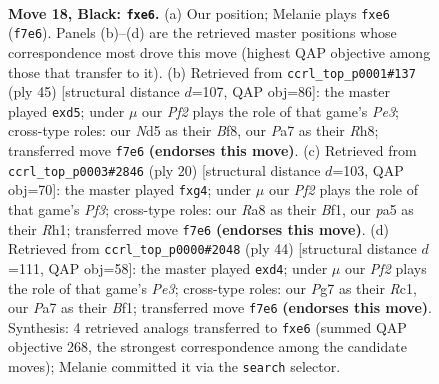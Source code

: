 \documentclass[11pt]{article}
\begin{document}
\clearpage

\begin{figure}[p]\centering
\begin{subfigure}{0.46\textwidth}\centering
\resizebox{\linewidth}{!}{%
\newchessgame
\chessboard[
  setfen={rn2r1k1/ppq2ppp/4N3/P1bn4/7P/1N4P1/1P3PB1/R1BQ1RK1 b - - 0 18},
  showmover=false,
  pgfstyle=straightmove, color=movearrow, markmove={f7-e6}
]}
\caption{}
\end{subfigure}\hfill
\begin{subfigure}{0.46\textwidth}\centering
\resizebox{\linewidth}{!}{%
\newchessgame
\chessboard[
  setfen={4kb1r/n1q2p2/1r2p3/3NP2p/bp1N4/3BQ3/P1P3PP/1K1RR3 b k - 0 23},
  showmover=false,
  pgfstyle=straightmove, color=movearrow, markmove={e6-d5}
]}
\caption{}
\end{subfigure}
\\[4pt]
\begin{subfigure}{0.46\textwidth}\centering
\resizebox{\linewidth}{!}{%
\newchessgame
\chessboard[
  setfen={r1bq1rk1/ppp2pbp/2n3p1/8/2QNP1n1/2N1BP2/PP4PP/R3KB1R w KQ - 1 11},
  showmover=false,
  pgfstyle=straightmove, color=movearrow, markmove={f3-g4}
]}
\caption{}
\end{subfigure}\hfill
\begin{subfigure}{0.46\textwidth}\centering
\resizebox{\linewidth}{!}{%
\newchessgame
\chessboard[
  setfen={1r2r1k1/3bqpp1/p6p/3p4/1n1b4/Q1N1P3/PR3PPP/2R2BK1 w - - 0 23},
  showmover=false,
  pgfstyle=straightmove, color=movearrow, markmove={e3-d4}
]}
\caption{}
\end{subfigure}
\caption{\textbf{Move 18, Black: \texttt{fxe6}.} (a) Our position; Melanie plays \texttt{fxe6} (\texttt{f7e6}). Panels (b)--(d) are the retrieved master positions whose correspondence most drove this move (highest QAP objective among those that transfer to it). (b) Retrieved from \texttt{ccrl\_top\_p0001\#137} (ply 45) [structural distance $d$=107, QAP obj=86]: the master played \texttt{exd5}; under $\mu$ our \emph{Pf2} plays the role of that game's \emph{Pe3}; cross-type roles: our \emph{N}d5 as their \emph{B}f8, our \emph{P}a7 as their \emph{R}h8; transferred move \texttt{f7e6} \textbf{(endorses this move)}. (c) Retrieved from \texttt{ccrl\_top\_p0003\#2846} (ply 20) [structural distance $d$=103, QAP obj=70]: the master played \texttt{fxg4}; under $\mu$ our \emph{Pf2} plays the role of that game's \emph{Pf3}; cross-type roles: our \emph{R}a8 as their \emph{B}f1, our \emph{p}a5 as their \emph{R}h1; transferred move \texttt{f7e6} \textbf{(endorses this move)}. (d) Retrieved from \texttt{ccrl\_top\_p0000\#2048} (ply 44) [structural distance $d$=111, QAP obj=58]: the master played \texttt{exd4}; under $\mu$ our \emph{Pf2} plays the role of that game's \emph{Pe3}; cross-type roles: our \emph{P}g7 as their \emph{R}c1, our \emph{P}a7 as their \emph{B}f1; transferred move \texttt{f7e6} \textbf{(endorses this move)}. Synthesis: 4 retrieved analogs transferred to \texttt{fxe6} (summed QAP objective 268, the strongest correspondence among the candidate moves); Melanie committed it via the \texttt{search} selector.}
\label{fig:thought-m35}
\end{figure}
\end{document}
